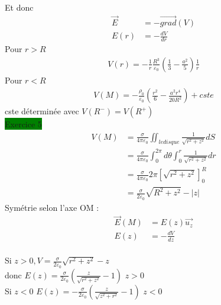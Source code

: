 \documentclass[a4paper]{article}
\begin{document}
Et donc \begin{align*}
    \vec{E} &= -\vec{grad}(V)\\
    E(r) &= - \frac{dV}{dr}
\end{align*}
Pour \(r > R\) \begin{align*}
    V(r) = -\frac{1}{r}\frac{R^3}{\varepsilon_0}(\frac{1}{3}-\frac{a^2}{5})\frac{1}{r}
\end{align*}
Pour \(r < R\)\begin{align*}
    V(M) = -\frac{\rho_0}{\varepsilon_0} (\frac{r^2}{6}-\frac{a^2 r^4}{20R^2}) + cste 
\end{align*}
cste déterminée avec \(V(R^-) = V(R^+)\)\\

\noindent \colorbox{green}{Exercice 5} \begin{align*}
    V(M) &= \frac{\sigma}{4\pi \varepsilon_0} \iint_{le disque} \frac{1}{\sqrt{r^2 + z^2}}dS\\
    &= \frac{\sigma}{4\pi \varepsilon_0} \int_{0}^{2\pi} d\theta \int_{0}^{r} \frac{1}{\sqrt{r^2 + z^2}} dr\\
    &= \frac{\sigma}{4\pi \varepsilon_0} 2\pi [\sqrt{r^2 + z^2}]_0^R\\
    &= \frac{\sigma}{2\varepsilon_0} \sqrt{R^2 + z^2} - |z|
\end{align*}
Symétrie selon l'axe OM : \begin{align*}
    \vec{E}(M) &= E(z)\vec{u_z}\\
    E(z) &= -\frac{dV}{dz}
\end{align*}\\
Si \(z > 0, V = \frac{\sigma}{2\varepsilon_0}\sqrt{r^2 + z^2} - z\)\\
donc \(E(z) = \frac{\sigma}{2\varepsilon_0}(\frac{z}{\sqrt{r^2 + z^2}}-1)\) \(z > 0\)\\
Si \(z < 0\) \(E(z) = -\frac{\sigma}{2\varepsilon_0}(\frac{z}{\sqrt{z^2 + r^2}}-1)\) \(z < 0\)\\
\end{document}
